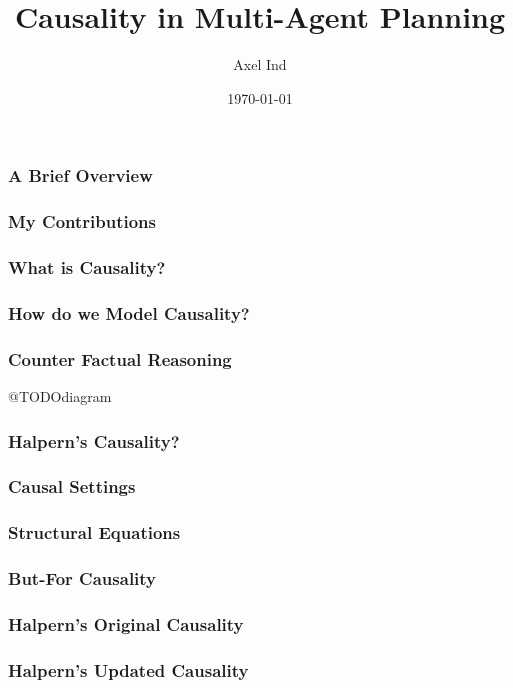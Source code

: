 \documentclass{beamer}
\title{Causality in Multi-Agent Planning}
\author{Axel Ind}
\institute{ALU-Freiburg}
\date{\today}
\begin{document}
 
\frame{\titlepage}

\begin{frame}
\frametitle{A Brief Overview}

\end{frame}


\begin{frame}
\frametitle{My Contributions}

\end{frame}


 
\begin{frame}
\frametitle{What is Causality?}

\end{frame}




\begin{frame}
\frametitle{How do we Model Causality?}

\end{frame}


\begin{frame}
\frametitle{Counter Factual Reasoning}
@TODOdiagram

\end{frame}


\begin{frame}
\frametitle{Halpern's Causality?}

\end{frame}


\begin{frame}
\frametitle{Causal Settings}

\end{frame}


\begin{frame}
\frametitle{Structural Equations}

\end{frame}


\begin{frame}
\frametitle{But-For Causality}

\end{frame}

\begin{frame}
\frametitle{Halpern's Original Causality}

\end{frame}


\begin{frame}
\frametitle{Halpern's Updated Causality}

\end{frame}
\end{document}

